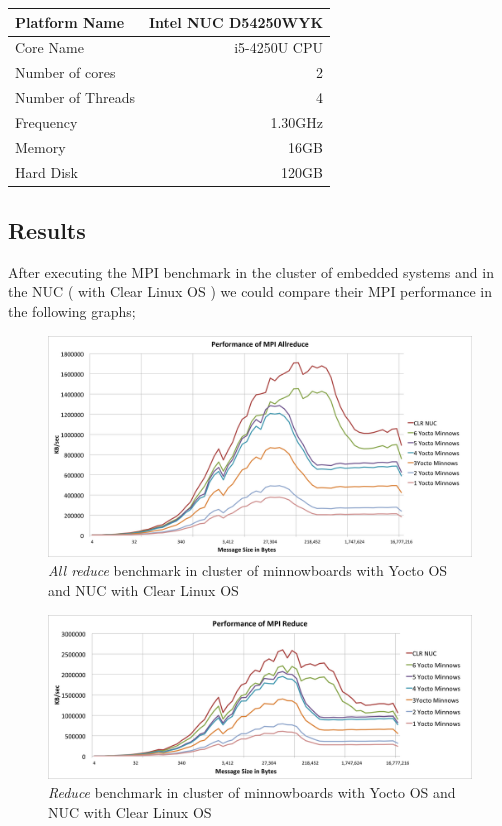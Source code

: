     \begin{center}
    \begin{tabular}{ | l | r |}
        \hline
        Platform Name & Intel NUC D54250WYK \\ \hline
        Core Name & i5-4250U CPU  \\ \hline
        Number of cores & 2 \\ \hline
        Number of Threads & 4 \\ \hline
        Frequency & 1.30GHz \\ \hline
        Memory & 16GB\\ \hline
        Hard Disk & 120GB \\ \hline
    \end{tabular}
    \end{center}



\subsection{Results}

After executing the MPI benchmark in the cluster of embedded systems  and in
the NUC ( with Clear Linux OS ) we could compare their MPI performance in the
following graphs; 

\begin{figure}[H]
\centering
\includegraphics[width=1.0\textwidth]{images/mpbench_cluster_experiments/mpi_all_reduce.png}
\caption{\textit{All reduce} benchmark in cluster of minnowboards with Yocto OS and NUC
with Clear Linux OS}
\label{all_reduce_cluster}
\end{figure}


\begin{figure}[H]
\centering
\includegraphics[width=1.0\textwidth]{images/mpbench_cluster_experiments/mpi_reduce.png}
\caption{\textit{Reduce} benchmark in cluster of minnowboards with Yocto OS and NUC
with Clear Linux OS}
\label{reduce_cluster}
\end{figure}



